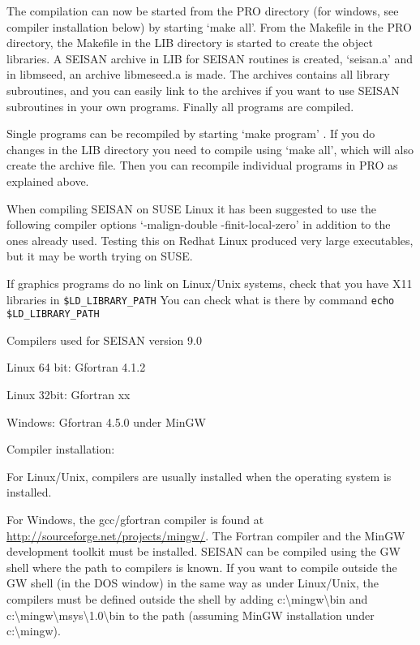 The compilation can now be started from the PRO directory (for windows, see 
compiler installation below) by starting `make all'. From the Makefile in 
the PRO directory, the Makefile in the LIB directory is started to create 
the object libraries. A SEISAN archive in LIB for SEISAN routines is created, 
`seisan.a' and in libmseed, an archive libmeseed.a is made. The archives contains  
all library subroutines, and you can easily link to the archives if you want 
to use SEISAN subroutines in your own programs. Finally all programs are compiled. 

Single programs can be recompiled by starting `make program' .
If you do changes in the LIB directory you need to compile using `make all', 
which will also create the archive file. Then you can recompile individual 
programs in PRO as explained above.

When compiling SEISAN on SUSE Linux it has been suggested to use the following 
compiler options `-malign-double -finit-local-zero' in addition to the ones 
already used. Testing this on Redhat Linux produced very large executables, 
but it may be worth trying on SUSE.

If graphics programs do no link on Linux/Unix systems, check that you have 
X11 libraries in \newline
\texttt{\$LD\_LIBRARY\_PATH}\newline
You can check what is there by command \newline
\texttt{echo \$LD\_LIBRARY\_PATH}

Compilers used for SEISAN version 9.0

Linux 64 bit: Gfortran 4.1.2

Linux 32bit: Gfortran xx

Windows: Gfortran 4.5.0 under MinGW

Compiler installation: 

For Linux/Unix, compilers are usually installed when the operating system 
is installed. 

For Windows, the gcc/gfortran compiler is found at 
\url{http://sourceforge.net/projects/mingw/}. 
The Fortran compiler and the MinGW development toolkit must be installed. 
SEISAN can be compiled using the GW shell where the path to compilers is 
known. If you want to compile outside the GW shell (in the DOS window) 
in the same way as under Linux/Unix, the compilers must be defined outside 
the shell by adding c:\textbackslash mingw\textbackslash bin and c:\textbackslash mingw\textbackslash msys\textbackslash 1.0\textbackslash bin to the path 
(assuming MinGW installation under c:\textbackslash mingw). 


